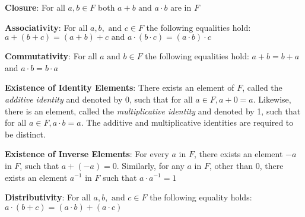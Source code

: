 \documentclass{article}
\begin{document}
\textbf{Closure}: For all $a, b \in F$ both $a + b \text{ and } a \cdot b$
are in $F$

\textbf{Associativity}: For all $a, b, \text{ and } c \in F$ the following
equalities hold: $a + (b + c) = (a + b) + c \text{ and } a \cdot (b \cdot c) =
(a \cdot b) \cdot c$

\textbf{Commutativity}: For all $a \text{ and } b \in F$ the following 
equalities hold: $a + b = b + a$ and $a \cdot b = b \cdot a$

\textbf{Existence of Identity Elements}: There exists an element of $F$,
called the \textit{additive identity} and denoted by 0, such that for all
$a \in F, a + 0 = a$. Likewise, there is an element, called the
\textit{multiplicative identity} and denoted by 1, such that for all $a \in F,
a \cdot b = a$. The additive and multiplicative identities are required
to be distinct.

\textbf{Existence of Inverse Elements}: For every $a$ in $F$, there exists
an element $-a$ in $F$, such that $a + (-a) = 0$. Similarly, for any $a$ in $F$,
other than 0, there exists an element $a^{-1}$ in $F$ such that $a \cdot a^{-1} = 1$

\textbf{Distributivity}: For all $a, b, \text{ and } c \in F$ the following equality
holds: $a \cdot (b + c) = (a \cdot b) + (a \cdot c)$
\end{document}
